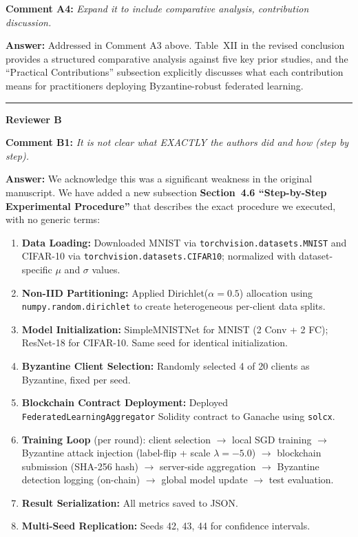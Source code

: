 \documentclass[12pt,a4paper,onecolumn]{article}
\begin{document}
\bigskip

\noindent\textbf{Comment A4:} \textit{Expand it to include comparative analysis, contribution discussion.}

\noindent\textbf{Answer:} Addressed in Comment A3 above. Table~XII in the revised conclusion provides a structured comparative analysis against five key prior studies, and the ``Practical Contributions'' subsection explicitly discusses what each contribution means for practitioners deploying Byzantine-robust federated learning.

\bigskip

\noindent\rule{\textwidth}{0.4pt}

\bigskip

\noindent\textbf{\large Reviewer B}

\bigskip

\noindent\textbf{Comment B1:} \textit{It is not clear what EXACTLY the authors did and how (step by step).}

\noindent\textbf{Answer:} We acknowledge this was a significant weakness in the original manuscript. We have added a new subsection \textbf{Section~4.6 ``Step-by-Step Experimental Procedure''} that describes the exact procedure we executed, with no generic terms:

\begin{enumerate}
    \item \textbf{Data Loading:} Downloaded MNIST via \texttt{torchvision.datasets.MNIST} and CIFAR-10 via \texttt{torchvision.datasets.CIFAR10}; normalized with dataset-specific $\mu$ and $\sigma$ values.
    \item \textbf{Non-IID Partitioning:} Applied Dirichlet($\alpha=0.5$) allocation using \texttt{numpy.random.dirichlet} to create heterogeneous per-client data splits.
    \item \textbf{Model Initialization:} SimpleMNISTNet for MNIST (2 Conv + 2 FC); ResNet-18 for CIFAR-10. Same seed for identical initialization.
    \item \textbf{Byzantine Client Selection:} Randomly selected 4 of 20 clients as Byzantine, fixed per seed.
    \item \textbf{Blockchain Contract Deployment:} Deployed \texttt{FederatedLearningAggregator} Solidity contract to Ganache using \texttt{solcx}.
    \item \textbf{Training Loop} (per round): client selection $\rightarrow$ local SGD training $\rightarrow$ Byzantine attack injection (label-flip + scale $\lambda=-5.0$) $\rightarrow$ blockchain submission (SHA-256 hash) $\rightarrow$ server-side aggregation $\rightarrow$ Byzantine detection logging (on-chain) $\rightarrow$ global model update $\rightarrow$ test evaluation.
    \item \textbf{Result Serialization:} All metrics saved to JSON.
    \item \textbf{Multi-Seed Replication:} Seeds 42, 43, 44 for confidence intervals.
\end{enumerate}
\end{document}
